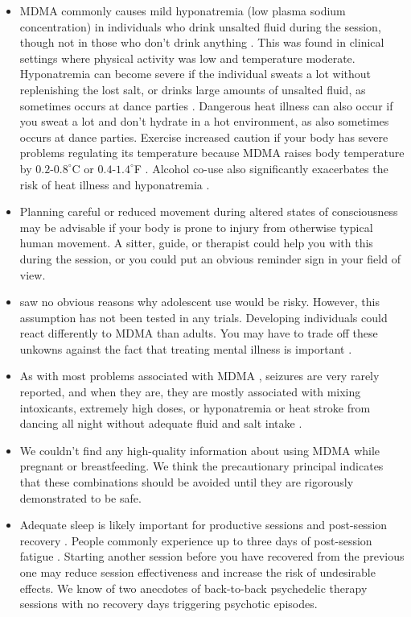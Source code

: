 \documentclass[12pt,letterpaper]{book}
\begin{document}
\begin{itemize}
    \item MDMA commonly causes mild hyponatremia (low plasma sodium concentration) in individuals who drink unsalted fluid during the session, though not in those who don't drink anything \cite{atilaHyponatremia}. This was found in clinical settings where physical activity was low and temperature moderate. Hyponatremia can become severe if the individual sweats a lot without replenishing the lost salt, or drinks large amounts of unsalted fluid, as sometimes occurs at dance parties \cite{vanOverheatingAlcohol}. Dangerous heat illness can also occur if you sweat a lot and don't hydrate in a hot environment, as also sometimes occurs at dance parties. Exercise increased caution if your body has severe problems regulating its temperature because MDMA raises body temperature by $0.2$-$0.8^{\circ}$C or $0.4$-$1.4^{\circ}$F \cite{liechti2014effects}. Alcohol co-use also significantly exacerbates the risk of heat illness and hyponatremia \cite{vanOverheatingAlcohol}.
    \item Planning careful or reduced movement during altered states of consciousness may be advisable if your body is prone to injury from otherwise typical human movement. A sitter, guide, or therapist could help you with this during the session, or you could put an obvious reminder sign in your field of view.
    \item \textcite{kangaslampiAdolescent} saw no obvious reasons why adolescent use would be risky. However, this assumption has not been tested in any trials. Developing individuals could react differently to MDMA than adults. You may have to trade off these unkowns against the fact that treating mental illness is important \cite{mitchellMDMAClinicalTrial}.
    \item As with most problems associated with MDMA \cite{riggDeaths}, seizures are very rarely reported, and when they are, they are mostly associated with mixing intoxicants, extremely high doses, or hyponatremia or heat stroke from dancing all night without adequate fluid and salt intake \cite{freidelSeizures}.
    \item We couldn't find any high-quality information about using MDMA while pregnant or breastfeeding. We think the precautionary principal indicates that these combinations should be avoided until they are rigorously demonstrated to be safe.
    \item Adequate sleep is likely important for productive sessions and post-session recovery \cite{simon2020sleep}. People commonly experience up to three days of post-session fatigue \cite{liechtiGender}. Starting another session before you have recovered from the previous one may reduce session effectiveness and increase the risk of undesirable effects. We know of two anecdotes of back-to-back psychedelic therapy sessions with no recovery days triggering psychotic episodes.

\end{itemize}
\end{document}
